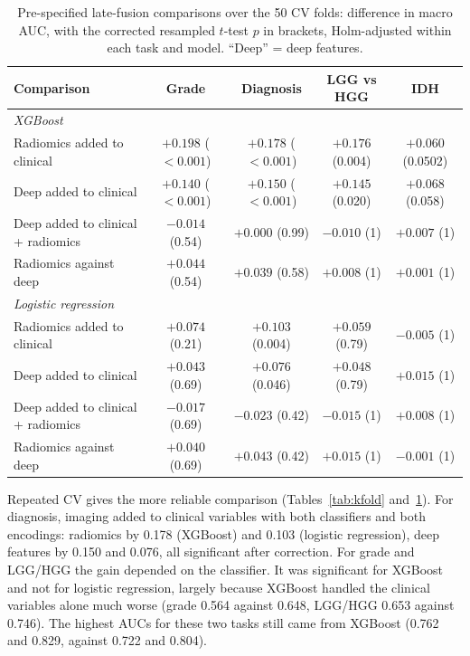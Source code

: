 \documentclass[11pt]{article}
\begin{document}
\begin{table}[t]
\centering
\caption{Pre-specified late-fusion comparisons over the 50 CV folds: difference in macro AUC, with the corrected
resampled $t$-test $p$ in brackets, Holm-adjusted within each task and model. ``Deep'' = deep features.}
\label{tab:kfoldtests}
\small
\begin{tabular}{lcccc}
\toprule
Comparison & Grade & Diagnosis & LGG vs HGG & IDH \\
\midrule
\multicolumn{5}{l}{\emph{XGBoost}} \\
Radiomics added to clinical & $+0.198$ ($<0.001$) & $+0.178$ ($<0.001$) & $+0.176$ (0.004) & $+0.060$ (0.0502) \\
Deep added to clinical & $+0.140$ ($<0.001$) & $+0.150$ ($<0.001$) & $+0.145$ (0.020) & $+0.068$ (0.058) \\
Deep added to clinical + radiomics & $-0.014$ (0.54) & $+0.000$ (0.99) & $-0.010$ (1) & $+0.007$ (1) \\
Radiomics against deep & $+0.044$ (0.54) & $+0.039$ (0.58) & $+0.008$ (1) & $+0.001$ (1) \\
\midrule
\multicolumn{5}{l}{\emph{Logistic regression}} \\
Radiomics added to clinical & $+0.074$ (0.21) & $+0.103$ (0.004) & $+0.059$ (0.79) & $-0.005$ (1) \\
Deep added to clinical & $+0.043$ (0.69) & $+0.076$ (0.046) & $+0.048$ (0.79) & $+0.015$ (1) \\
Deep added to clinical + radiomics & $-0.017$ (0.69) & $-0.023$ (0.42) & $-0.015$ (1) & $+0.008$ (1) \\
Radiomics against deep & $+0.040$ (0.69) & $+0.043$ (0.42) & $+0.015$ (1) & $-0.001$ (1) \\
\bottomrule
\end{tabular}
\end{table}

Repeated CV gives the more reliable comparison (Tables~\ref{tab:kfold} and~\ref{tab:kfoldtests}). For diagnosis,
imaging added to clinical variables with both classifiers and both encodings: radiomics by 0.178 (XGBoost) and 0.103
(logistic regression), deep features by 0.150 and 0.076, all significant after correction. For grade and LGG/HGG the
gain depended on the classifier. It was significant for XGBoost and not for logistic regression, largely because
XGBoost handled the clinical variables alone much worse (grade 0.564 against 0.648, LGG/HGG 0.653 against 0.746). The
highest AUCs for these two tasks still came from XGBoost (0.762 and 0.829, against 0.722 and 0.804).
\end{document}
